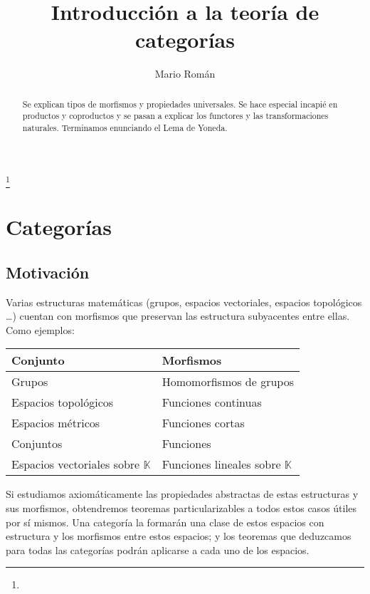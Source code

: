 \documentclass[a4paper, 11pt]{amsart}
\theoremstyle{definition}
\theoremstyle{remark}
\numberwithin{equation}{section}
\begin{document}
\title{Introducción a la teoría de categorías}


\author{Mario Román}
\address{}
\curraddr{}
\email{}
\thanks{}


\keywords{}

\date{}

\dedicatory{}

\begin{abstract}
  Se explican tipos de morfismos y propiedades universales. Se hace especial incapié en productos y
  coproductos y se pasan a explicar los functores y las transformaciones naturales.
  Terminamos enunciando el Lema de Yoneda.
\end{abstract}

\maketitle

\section {Categorías}
  \subsection {Motivación}
    Varias estructuras matemáticas (grupos, espacios vectoriales, espacios topológicos \dots) cuentan
    con morfismos que preservan las estructura subyacentes entre ellas. Como ejemplos:
    \begin {center}
    \begin{tabular}{l|l}
      Conjunto & Morfismos \\
      \hline
      Grupos & Homomorfismos de grupos \\
      Espacios topológicos & Funciones continuas \\
      Espacios métricos & Funciones cortas \\
      Conjuntos & Funciones \\
      Espacios vectoriales sobre $\mathbb{K}$ & Funciones lineales sobre $\mathbb{K}$ \\
    \end{tabular}
    \end{center}
    Si estudiamos axiomáticamente las propiedades abstractas de estas estructuras y sus morfismos,
    obtendremos teoremas particularizables a todos estos casos útiles por sí mismos.
    Una categoría la formarán una clase de estos espacios con estructura y los morfismos entre estos
    espacios; y los teoremas que deduzcamos para todas las categorías podrán aplicarse a cada uno de
    los espacios.
    
\end{document}
